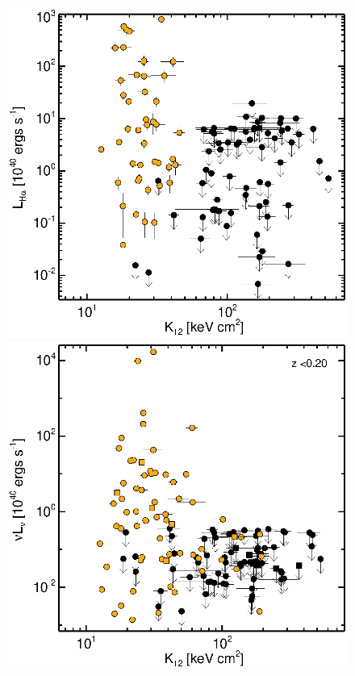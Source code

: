 \documentclass[11pt]{article}
\begin{document}
\begin{figure}[h]
  \begin{minipage}[t]{0.5\linewidth}
    \centering
    \includegraphics*[width=\textwidth, trim=28mm 8mm 35mm 18mm, clip]{resp_f1}
  \end{minipage}
  \hspace{0.25cm}
  \begin{minipage}[t]{0.5\linewidth}
    \centering
    \includegraphics*[width=\textwidth, trim=28mm 8mm 35mm 18mm, clip]{resp_f2}
  \end{minipage}
\end{figure}
\end{document}
